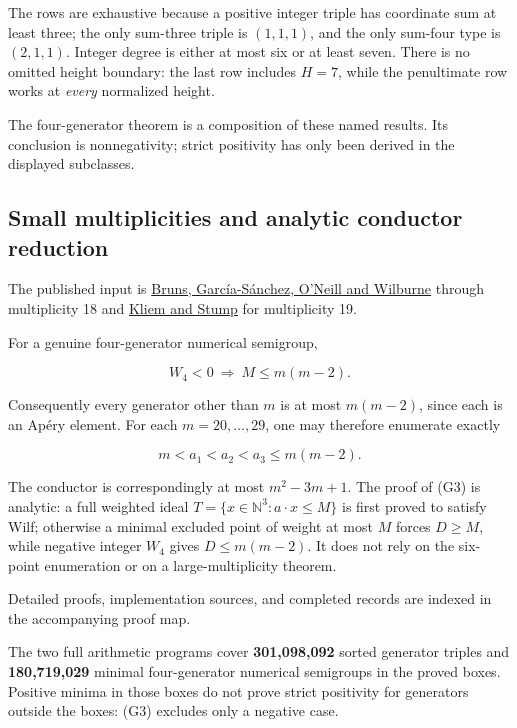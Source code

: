 \documentclass[
  11pt,
  a4paper,
]{article}
\begin{document}
The rows are exhaustive because a positive integer triple has coordinate
sum at least three; the only sum-three triple is \((1,1,1)\), and the
only sum-four type is \((2,1,1)\). Integer degree is either at most six
or at least seven. There is no omitted height boundary: the last row
includes \(H=7\), while the penultimate row works at \emph{every}
normalized height.

The four-generator theorem is a composition of these named results. Its
conclusion is nonnegativity; strict positivity has only been derived in
the displayed subclasses.

\hypertarget{small-multiplicities-and-analytic-conductor-reduction}{%
\subsection{Small multiplicities and analytic conductor
reduction}\label{small-multiplicities-and-analytic-conductor-reduction}}

The published input is \href{https://arxiv.org/abs/1903.04342}{Bruns,
García-Sánchez, O'Neill and Wilburne} through multiplicity 18 and
\href{https://arxiv.org/abs/1905.01945}{Kliem and Stump} for
multiplicity 19.

For a genuine four-generator numerical semigroup,

\[
\boxed{W_4<0\ \Longrightarrow\ M\le m(m-2).} \tag{G3}
\]

Consequently every generator other than \(m\) is at most \(m(m-2)\),
since each is an Apéry element. For each \(m=20,\ldots,29\), one may
therefore enumerate exactly

\[
m<a_1<a_2<a_3\le m(m-2).
\]

The conductor is correspondingly at most \(m^2-3m+1\). The proof of (G3)
is analytic: a full weighted ideal
\(T=\{x\in\mathbb N^3:a\cdot x\le M\}\) is first proved to satisfy Wilf;
otherwise a minimal excluded point of weight at most \(M\) forces
\(D\ge M\), while negative integer \(W_4\) gives \(D\le m(m-2)\). It
does not rely on the six-point enumeration or on a large-multiplicity
theorem.

Detailed proofs, implementation sources, and completed records are
indexed in the accompanying proof map.

The two full arithmetic programs cover \textbf{301,098,092} sorted
generator triples and \textbf{180,719,029} minimal four-generator
numerical semigroups in the proved boxes. Positive minima in those boxes
do not prove strict positivity for generators outside the boxes: (G3)
excludes only a negative case.
\end{document}
